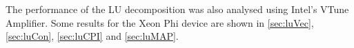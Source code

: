 \par{The performance of the LU decomposition was also analysed 
    using Intel’s VTune Amplifier. Some results for the Xeon Phi 
    device are shown in \ref{sec:luVec}, \ref{sec:luCon}, \ref{sec:luCPI} and 
    \ref{sec:luMAP}.}

